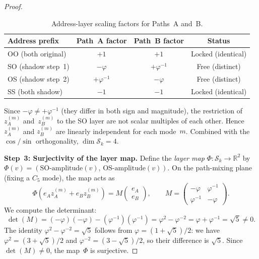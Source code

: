 \documentclass[11pt,a4paper]{amsart}
\theoremstyle{plain}
\theoremstyle{definition}
\theoremstyle{remark}
\newcommand{\R}{\mathbb{R}}
\newcommand{\vp}{\varphi}
\begin{document}
\begin{proof}
\begin{table}[ht]
\centering
\caption{Address-layer scaling factors for Paths~A and~B.}
\label{tab:scaling}
\begin{tabular}{lccc}
\toprule
Address prefix & Path~A factor & Path~B factor & Status \\
\midrule
OO (both original) & $+1$        & $+1$        & Locked (identical) \\
SO (shadow step~1)  & $-\vp$     & $+\vp^{-1}$ & Free (distinct) \\
OS (shadow step~2)  & $+\vp^{-1}$ & $-\vp$     & Free (distinct) \\
SS (both shadow)   & $-1$        & $-1$        & Locked (identical) \\
\bottomrule
\end{tabular}
\end{table}

\noindent
Since $-\vp \neq +\vp^{-1}$ (they differ in both sign and magnitude), the
restriction of~$z_A^{(m)}$ and~$z_B^{(m)}$ to the SO layer are not scalar
multiples of each other.  Hence $z_A^{(m)}$ and $z_B^{(m)}$ are linearly
independent for each mode~$m$.  Combined with the $\cos/\sin$ orthogonality,
$\dim \mathcal{S}_k = 4$.

\medskip
\noindent\textbf{Step~3: Surjectivity of the layer map.}
Define the \emph{layer map} $\Phi \colon \mathcal{S}_k \to \R^2$ by
$\Phi(v) = (\text{SO-amplitude}(v),\, \text{OS-amplitude}(v))$.
On the path-mixing plane (fixing a $C_5$ mode), the map acts as
\[
  \Phi(e_A z_A^{(m)} + e_B z_B^{(m)})
  = M \begin{pmatrix} e_A \\ e_B \end{pmatrix},
  \qquad
  M = \begin{pmatrix} -\vp & \vp^{-1} \\ \vp^{-1} & -\vp \end{pmatrix}.
\]
We compute the determinant:
\begin{equation}\label{eq:det-sqrt5}
  \boxed{\det(M) = (-\vp)(-\vp) - (\vp^{-1})(\vp^{-1})
  = \vp^2 - \vp^{-2} = \vp + \vp^{-1} = \sqrt{5} \neq 0.}
\end{equation}
The identity $\vp^2 - \vp^{-2} = \sqrt{5}$ follows from
$\vp = (1+\sqrt{5})/2$: we have $\vp^2 = (3+\sqrt{5})/2$ and
$\vp^{-2} = (3-\sqrt{5})/2$, so their difference is $\sqrt{5}$.
Since $\det(M) \neq 0$, the map~$\Phi$ is surjective.


\end{proof}
\end{document}
